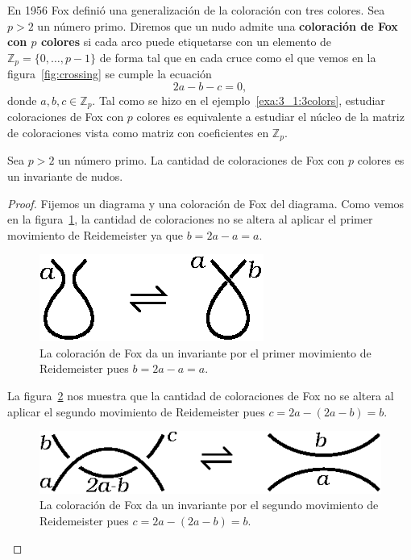 \documentclass[graybox]{svmult}
\newcommand{\Z}{\mathbb{Z}}
\begin{document}
\label{block:fox}
En 1956 Fox definió una generalización de la coloración con tres colores.
Sea $p>2$ un número primo. Diremos que un nudo admite una \textbf{coloración de
Fox con $p$ colores} si cada arco puede etiquetarse con un elemento de 
$\Z_p=\{0,\dots,p-1\}$ de forma tal que en cada cruce como el que vemos
en la figura~\ref{fig:crossing} se cumple la ecuación
\[
	2a-b-c=0,
\]
donde $a,b,c\in\Z_p$.  Tal como se hizo en el
ejemplo~\ref{exa:3_1:3colors}, estudiar coloraciones de Fox con $p$ colores es
equivalente a estudiar el núcleo de la matriz de coloraciones vista como matriz
con coeficientes en $\Z_p$.

\begin{theorem}
    \label{theorem:fox}
    Sea $p>2$ un número primo.  La cantidad de coloraciones de Fox con $p$ colores es
    un invariante de nudos. 

    \begin{proof}
        Fijemos un diagrama y una coloración de Fox del diagrama. Como vemos en la
        figura~\ref{fig:coloringR1}, la cantidad de coloraciones no se altera al aplicar el
        primer movimiento de Reidemeister ya que $b=2a-a=a$. 

        \begin{figure}[ht]
			\centering
	    	\includegraphics[scale=0.6]{images/coloringR1}
            \caption{La coloración de Fox da un invariante por el primer movimiento
            de Reidemeister pues $b=2a-a=a$.}
            \label{fig:coloringR1}
        \end{figure}

		La figura~\ref{fig:coloringR2} nos muestra que la cantidad de coloraciones de Fox 
		no se altera al aplicar el segundo movimiento de Reidemeister pues
		$c=2a-(2a-b)=b$.
        \begin{figure}[ht]
			\centering
	    	\includegraphics[scale=0.6]{images/coloringR2}
            \caption{La coloración de Fox da un invariante por el segundo movimiento
            de Reidemeister pues $c=2a-(2a-b)=b$.}
            \label{fig:coloringR2}
        \end{figure}



\end{proof}
\end{theorem}
\end{document}
